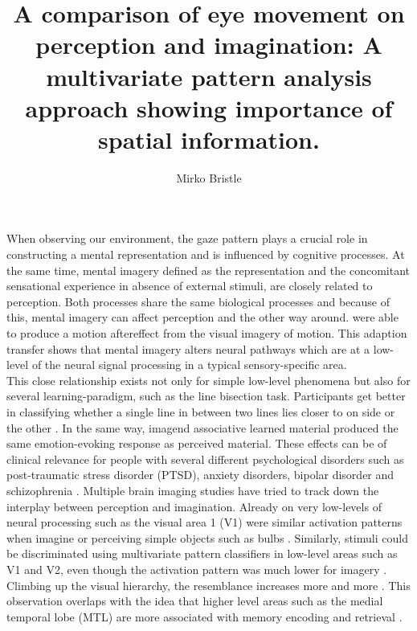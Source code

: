 \documentclass[a4paper,man,natbib,floatsintext]{apa6}
\title{A comparison of eye movement on perception and imagination: A multivariate pattern analysis approach showing importance of spatial information.}
\author{Mirko Bristle}
\affiliation{
Division of Cognitive Psychology, Perception and Research Methods\\
Department of Psychology\\
University of Bern }
\begin{document}
\maketitle
When observing our environment, the gaze pattern plays a crucial role in constructing a mental representation and is influenced by cognitive processes\citep{Hayhoe2005}. At the same time, mental imagery defined as the representation and the concomitant sensational experience in absence of external stimuli, are closely related to perception. Both processes share the same biological processes and because of this, mental imagery can affect perception and the other way around. \cite{Winawer2010} were able to produce a motion aftereffect from the visual imagery of motion. This adaption transfer shows that mental imagery alters neural pathways which are at a low-level of the neural signal processing in a typical sensory-specific area.\\
This close relationship exists not only for simple low-level phenomena but also for several learning-paradigm, such as the line bisection task. Participants get better in classifying whether a single line in between two lines lies closer to on side or the other \citep{Tartaglia2009}. In the same way, imagend associative learned material produced the same emotion-evoking response as perceived material\citep{Lewis2013}. These effects can be of clinical relevance for people with several different psychological disorders such as post-traumatic stress disorder (PTSD), anxiety disorders, bipolar disorder and schizophrenia \citep{Holmes2010}.
Multiple brain imaging studies have tried to track down the interplay between perception and imagination. Already on very low-levels of neural processing such as the visual area 1 (V1)  were similar activation patterns when imagine or perceiving simple objects such as bulbs \citep{Bergmann2016}. Similarly, stimuli could be discriminated using multivariate pattern classifiers in low-level areas such as  V1 and V2, even though the activation pattern was much lower for imagery \citep{Cichy2012, Lee2012}. Climbing up the visual hierarchy, the resemblance increases more and more \citep{Stokes2009}. This observation overlaps with the idea that higher level areas such as the medial temporal lobe (MTL) are more associated with memory encoding and retrieval \citep{Reddy2010, Johnson2014}. \\
\end{document}
